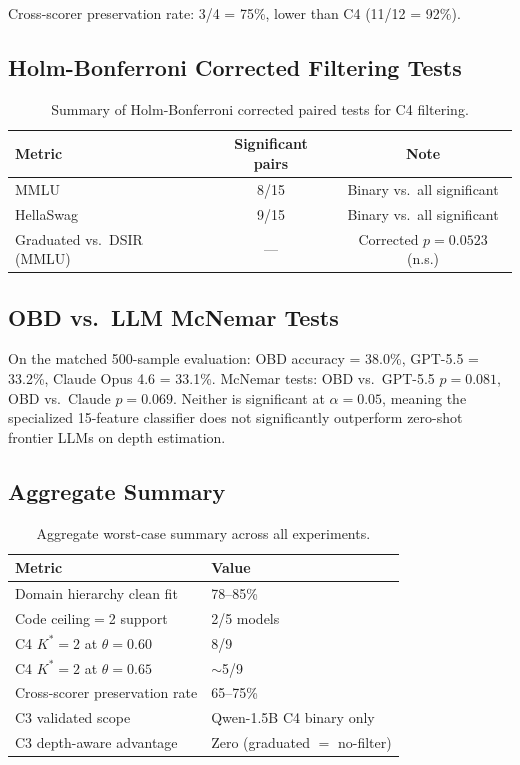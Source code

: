 \documentclass[11pt]{article}
\newcommand{\kstar}{K^*}
\newcommand{\thetaval}{\theta}
\begin{document}
Cross-scorer preservation rate: 3/4 = 75\%, lower than C4 (11/12 = 92\%).


\subsection{Holm-Bonferroni Corrected Filtering Tests}
\label{app:stats}

\begin{table}[h]
\centering
\caption{Summary of Holm-Bonferroni corrected paired tests for C4 filtering.}
\label{tab:holm}
\small
\begin{tabular}{lcc}
\toprule
Metric & Significant pairs & Note \\
\midrule
MMLU & 8/15 & Binary vs.\ all significant \\
HellaSwag & 9/15 & Binary vs.\ all significant \\
Graduated vs.\ DSIR (MMLU) & --- & Corrected $p = 0.0523$ (n.s.) \\
\bottomrule
\end{tabular}
\end{table}


\subsection{OBD vs.\ LLM McNemar Tests}
\label{app:mcnemar}

On the matched 500-sample evaluation: OBD accuracy = 38.0\%, GPT-5.5 = 33.2\%, Claude Opus 4.6 = 33.1\%. McNemar tests: OBD vs.\ GPT-5.5 $p = 0.081$, OBD vs.\ Claude $p = 0.069$. Neither is significant at $\alpha = 0.05$, meaning the specialized 15-feature classifier does not significantly outperform zero-shot frontier LLMs on depth estimation.


\subsection{Aggregate Summary}
\label{app:aggregate}

\begin{table}[h]
\centering
\caption{Aggregate worst-case summary across all experiments.}
\label{tab:aggregate}
\small
\begin{tabular}{ll}
\toprule
Metric & Value \\
\midrule
Domain hierarchy clean fit & 78--85\% \\
Code ceiling$=$2 support & 2/5 models \\
C4 $\kstar{=}2$ at $\thetaval{=}0.60$ & 8/9 \\
C4 $\kstar{=}2$ at $\thetaval{=}0.65$ & $\sim$5/9 \\
Cross-scorer preservation rate & 65--75\% \\
C3 validated scope & Qwen-1.5B C4 binary only \\
C3 depth-aware advantage & Zero (graduated $=$ no-filter) \\
\bottomrule
\end{tabular}
\end{table}
\end{document}
